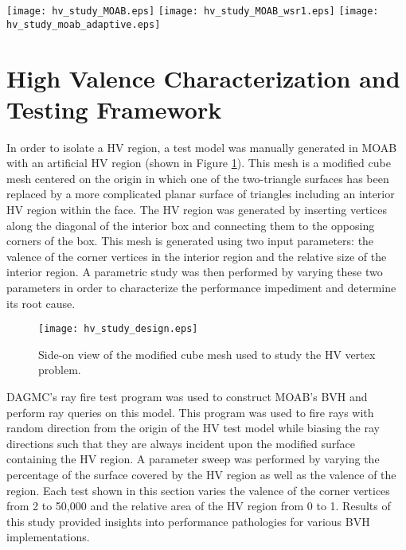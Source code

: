 \begin{sidewaysfigure}
  \centering
  \texttt{[image: hv\_study\_MOAB.eps]}
  \texttt{[image: hv\_study\_MOAB\_wsr1.eps]}
  \texttt{[image: hv\_study\_moab\_adaptive.eps]}
  \caption[High valence study results.]{HV characterization study
    results for all MOAB OBB tree implementations. Top Left: Unmodified MOAB
    results. Top Right: Manual modification of MOAB OBB tree's build
    settings. Bottom: Results with adaptive construction for HV regions.}
  \label{fig:moab_hv_studies}
\end{sidewaysfigure}

\section{High Valence Characterization and Testing Framework}

In order to isolate a HV region, a test model was manually generated in MOAB
with an artificial HV region (shown in Figure \ref{fig:hv_cube_design}). This
mesh is a modified cube mesh centered on the origin in which one of the
two-triangle surfaces has been replaced by a more complicated planar surface of
triangles including an interior HV region within the face. The HV region was
generated by inserting vertices along the diagonal of the interior box and
connecting them to the opposing corners of the box. This mesh is generated using
two input parameters: the valence of the corner vertices in the interior region
and the relative size of the interior region. A parametric study was then
performed by varying these two parameters in order to characterize the
performance impediment and determine its root cause.

\begin{figure}[H]
  \centering
    \texttt{[image: hv\_study\_design.eps]}
    \caption[High valence vertex test model.]{Side-on view of the modified cube
      mesh used to study the HV vertex problem.}
    \label{fig:hv_cube_design}
\end{figure}

DAGMC's ray fire test program was used to construct MOAB's BVH and perform ray
queries on this model. This program was used to fire rays with random
direction from the origin of the HV test model while biasing the ray directions
such that they are always incident upon the modified surface containing the HV
region. A parameter sweep was performed by varying the percentage of the surface
covered by the HV region as well as the valence of the region. Each test shown
in this section varies the valence of the corner vertices from 2 to 50,000 and
the relative area of the HV region from 0 to 1. Results of this study provided
insights into performance pathologies for various BVH implementations.

